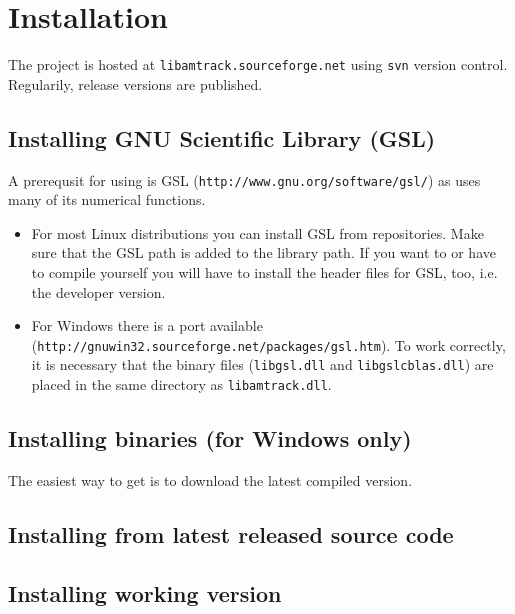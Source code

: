 
\chapter{Installation}

The \la{} project is hosted at \texttt{libamtrack.sourceforge.net} using \texttt{svn} version control. Regularily, release versions are published.

\section{Installing GNU Scientific Library (GSL)}

A prerequsit for using \la{} is GSL (\texttt{http://www.gnu.org/software/gsl/}) as \la{} uses many of its numerical functions.

\begin{itemize}
\item{For most Linux distributions you can install GSL from repositories. Make sure that the GSL path is added to the library path. If you want to or have to compile \la{} yourself you will have to install the header files for GSL, too, i.e. the developer version.}
\item{For Windows there is a port available (\texttt{http://gnuwin32.sourceforge.net/packages/gsl.htm}). To work correctly, it is necessary that the binary files (\texttt{libgsl.dll} and \texttt{libgslcblas.dll}) are placed in the same directory as \texttt{libamtrack.dll}.}
\end{itemize}

\section{Installing \la{} binaries (for Windows only)}
The easiest way to get \la{} is to download the latest compiled version.

\section{Installing \la{} from latest released source code}

\section{Installing \la{} working version}

